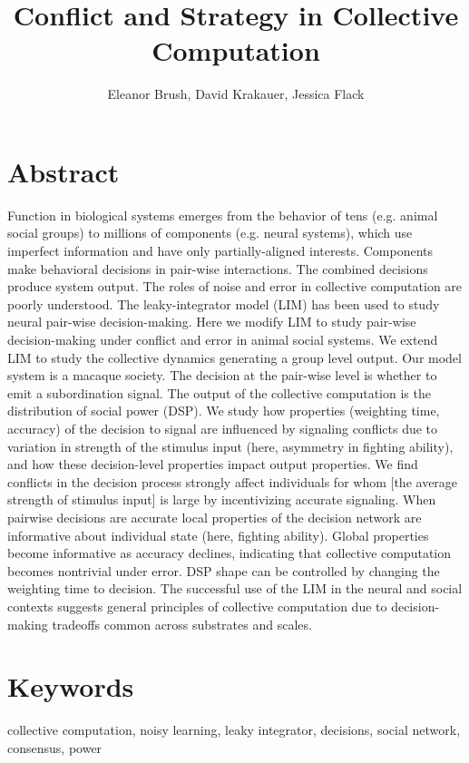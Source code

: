 \documentclass{article}
\title{Conflict and Strategy in Collective Computation}
\author{Eleanor Brush, David Krakauer, Jessica Flack}
\begin{document}
\maketitle

\section*{Abstract}
Function in biological systems emerges from the behavior of tens (e.g. animal social groups) to millions of components (e.g. neural systems), which use imperfect information and have only partially-aligned interests. Components make behavioral decisions in pair-wise interactions. The combined decisions produce system output. The roles of noise and error in collective computation are poorly understood. The leaky-integrator model (LIM) has been used to study neural pair-wise decision-making. Here we modify LIM to study pair-wise decision-making under conflict and error in animal social systems. We extend LIM to study the collective dynamics generating a group level output. Our model system is a macaque society. The decision at the pair-wise level is whether to emit a subordination signal. The output of the collective computation is the distribution of social power (DSP). We study how properties (weighting time, accuracy) of the decision to signal are influenced by signaling conflicts due to variation in strength of the stimulus input (here, asymmetry in fighting ability), and how these decision-level properties impact output properties. We find conflicts in the decision process strongly affect individuals for whom [the average strength of stimulus input] is large by incentivizing accurate signaling. When pairwise decisions are accurate local properties of the decision network are informative about individual state (here, fighting ability). Global properties become informative as accuracy declines, indicating that collective computation becomes nontrivial under error. DSP shape can be controlled by changing the weighting time to decision. The successful use of the LIM in the neural and social contexts suggests general principles of collective computation due to decision-making tradeoffs common across substrates and scales.

\section*{Keywords }
collective computation, noisy learning, leaky integrator, decisions, social network, consensus, power
\end{document}
